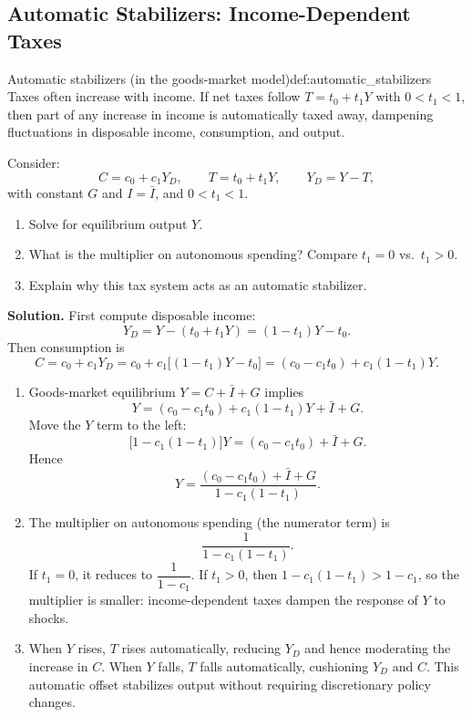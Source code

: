 \newpage
\subsection{Automatic Stabilizers: Income-Dependent Taxes}

\begin{definition}{Automatic stabilizers (in the goods-market model)}{def:automatic_stabilizers}
Taxes often increase with income. If net taxes follow
\(
T=t_0+t_1Y
\)
with $0<t_1<1$, then part of any increase in income is automatically taxed away,
dampening fluctuations in disposable income, consumption, and output.
\end{definition}

\begin{examplebox}[title={Worked Example (Tutorial 1, Question 4): Income-dependent taxes and the multiplier}]
Consider:
\[
C = c_0 + c_1Y_D,\qquad
T = t_0 + t_1Y,\qquad
Y_D = Y - T,
\]
with constant $G$ and $I=\bar I$, and $0<t_1<1$.
\begin{enumerate}[label=(\alph*)]
\item Solve for equilibrium output $Y$.
\item What is the multiplier on autonomous spending? Compare $t_1=0$ vs.\ $t_1>0$.
\item Explain why this tax system acts as an automatic stabilizer.
\end{enumerate}

\textbf{Solution.}
First compute disposable income:
\[
Y_D = Y - (t_0+t_1Y) = (1-t_1)Y - t_0.
\]
Then consumption is
\[
C = c_0 + c_1Y_D
  = c_0 + c_1\bigl[(1-t_1)Y - t_0\bigr]
  = (c_0 - c_1t_0) + c_1(1-t_1)Y.
\]

\begin{enumerate}[label=(\alph*)]
\item Goods-market equilibrium $Y=C+\bar I+G$ implies
\[
Y = (c_0 - c_1t_0) + c_1(1-t_1)Y + \bar I + G.
\]
Move the $Y$ term to the left:
\[
\bigl[1-c_1(1-t_1)\bigr]Y = (c_0 - c_1t_0) + \bar I + G.
\]
Hence
\[
Y = \frac{(c_0 - c_1t_0) + \bar I + G}{1-c_1(1-t_1)}.
\]

\item The multiplier on autonomous spending (the numerator term) is
\[
\frac{1}{1-c_1(1-t_1)}.
\]
If $t_1=0$, it reduces to $\dfrac{1}{1-c_1}$.
If $t_1>0$, then $1-c_1(1-t_1) > 1-c_1$, so the multiplier is smaller:
income-dependent taxes dampen the response of $Y$ to shocks.

\item When $Y$ rises, $T$ rises automatically, reducing $Y_D$ and hence moderating the increase in $C$.
When $Y$ falls, $T$ falls automatically, cushioning $Y_D$ and $C$.
This automatic offset stabilizes output without requiring discretionary policy changes.
\end{enumerate}
\end{examplebox}

